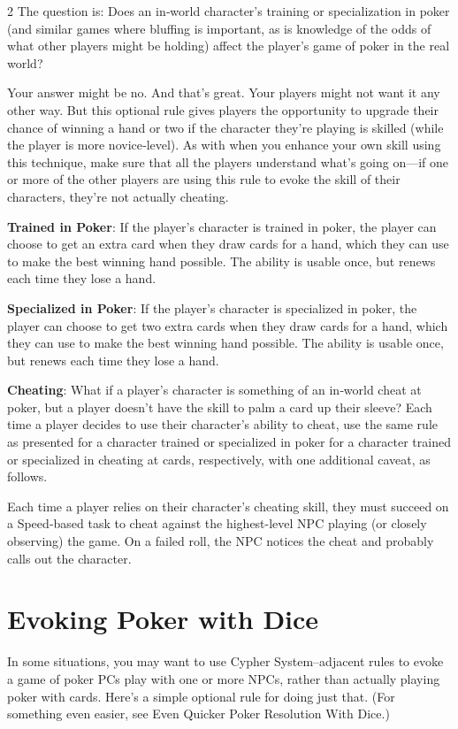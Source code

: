 \begin{multicols}{2}
The question is: Does an in‑world character’s training or specialization in poker (and similar games where bluffing is important, as is knowledge of the odds of what other players might be holding) affect the player’s game of poker in the real world? 

Your answer might be no. And that’s great. Your players might not want it any other way. But this optional rule gives players the opportunity to upgrade their chance of winning a hand or two if the character they’re playing is skilled (while the player is more novice‑level). As with when you enhance your own skill using this technique, make sure that all the players understand what’s going on—if one or more of the other players are using this rule to evoke the skill of their characters, they’re not actually cheating.

\textbf{Trained in Poker}: If the player’s character is trained in poker, the player can choose to get an extra card when they draw cards for a hand, which they can use to make the best winning hand possible. The ability is usable once, but renews each time they lose a hand. 

\textbf{Specialized in Poker}: If the player’s character is specialized in poker, the player can choose to get two extra cards when they draw cards for a hand, which they can use to make the best winning hand possible. The ability is usable once, but renews each time they lose a hand. 

\textbf{Cheating}: What if a player’s character is something of an in‑world cheat at poker, but a player doesn’t have the skill to palm a card up their sleeve? Each time a player decides to use their character’s ability to cheat, use the same rule as presented for a character trained or specialized in poker for a character trained or specialized in cheating at cards, respectively, with one additional caveat, as follows. 

Each time a player relies on their character’s cheating skill, they must succeed on a Speed‑based task to cheat against the highest-level NPC playing (or closely observing) the game. On a failed roll, the NPC notices the cheat and probably calls out the character.

\section{Evoking Poker with Dice}
 
In some situations, you may want to use Cypher System–adjacent rules to evoke a game of poker PCs play with one or more NPCs, rather than actually playing poker with cards. Here’s a simple optional rule for doing just that. (For something even easier, see Even Quicker Poker Resolution With Dice.) 


\end{multicols}
